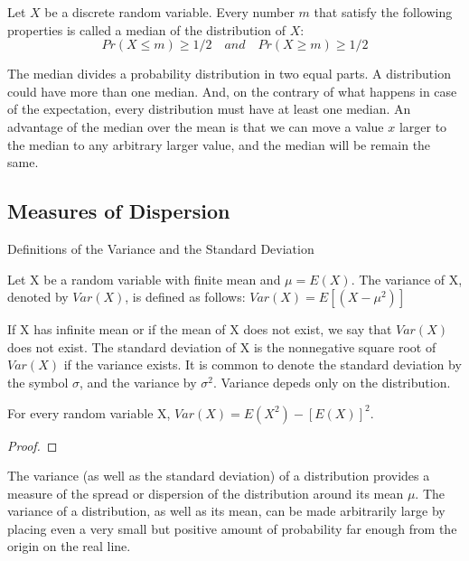\begin{definition}
Let $X$ be a discrete random variable. Every number $m$ that satisfy the following properties is called a median of the distribution of $X$:
\[
Pr\left(X\leq m\right)\geq1/2 \quad and \quad Pr\left(X\geq m\right) \geq 1/2
\]
\end{definition}

The median divides a probability distribution in two equal parts. A distribution could have more than one median. And, on the contrary of what happens in case of the expectation, every distribution must have at least one median. An advantage of the median over the mean is that we can move a value $x$ larger to the median to any arbitrary larger value, and the median will be remain the same. 

\subsection{Measures of Dispersion}

Definitions of the Variance and the Standard Deviation

\begin{definition}
Let X be a random variable with finite mean and $\mu=E\left(X\right)$. The variance of X, denoted by $Var\left(X\right)$, is defined as follows: $Var\left(X\right)=E\left[\left(X-\mu^{2}\right)\right]$
\end{definition}

{\color{red} If X has infinite mean or if the mean of X does not exist, we say that $Var\left(X\right)$ does not exist. The standard deviation of X is the nonnegative square root of $Var\left(X\right)$ if the variance exists. It is common to denote the standard deviation by the symbol $\sigma$, and the variance by $\sigma^{2}$. Variance depeds only on the distribution.}

\begin{proposition}
For every random variable X, $Var\left(X\right)=E\left(X^{2}\right)-\left[E\left(X\right)\right]^{2}$.
\end{proposition}
\begin{proof}
\end{proof}

{\color{red} The variance (as well as the standard deviation) of a distribution provides a measure of the spread or dispersion of the distribution around its mean $\mu$. The variance of a distribution, as well as its mean, can be made arbitrarily large by placing even a very small but positive amount of probability far enough from the origin on the real line.}

